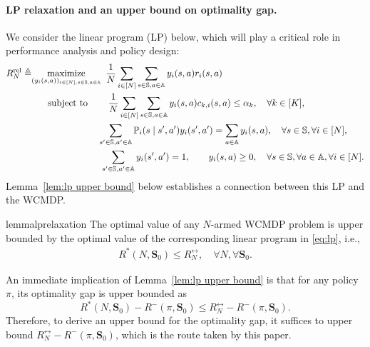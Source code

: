 \documentclass[11pt,letterpaper]{article}
\begin{document}
\paragraph{LP relaxation and an upper bound on optimality gap.}
We consider the linear program (LP) below, which will play a critical role in performance analysis and policy design:
\begin{subequations}\label{eq:lp}
\begin{align}
    R^{\rel}_N\triangleq&\underset{(y_i(s,a))_{i\in [N], s\in\sspa,a\in\aspa}}{\text{maximize}}\mspace{9mu}\frac{1}{N}\sum_{i\in[N]} \sum_{s\in\sspa,a\in\aspa} y_i(s,a)r_i(s,a)\\
    \label{eq:lp:budget-constraint}
    &\mspace{32mu}\text{subject to}\mspace{40mu}\frac{1}{N}\sum_{i\in[N]}\sum_{s\in\sspa,a\in\aspa} y_i(s,a)c_{k,i}(s,a)\leq \alpha_k,\quad\forall k\in[K],\\
    \label{eq:lp:stationarity-constraint}
    &\mspace{130mu} \sum_{s'\in\sspa,a'\in\aspa} \PP_i(s\mid s',a')y_i(s',a')=\sum_{a\in\aspa}y_i(s,a),\quad\forall s\in\sspa,\forall i\in[N],\\
    \label{eq:lp:probability-constraint}
   &\mspace{135mu}\sum_{s'\in\sspa,a'\in\aspa}y_i(s',a')=1, \qquad y_i(s,a)\geq 0, \quad \forall s\in\sspa,  \forall a\in \aspa,\forall i\in[N].
\end{align}
\end{subequations}
Lemma~\ref{lem:lp upper bound} below establishes a connection between this LP and the WCMDP.
\begin{restatable}{lemma}{lprelaxation}\label{lem:lp upper bound}
The optimal value of any $N$-armed WCMDP problem is upper bounded by the optimal value of the corresponding linear program in \eqref{eq:lp}, i.e.,
    \begin{align*}
        R^*(N,\bm{S}_0)\le R_N^{\rel},\quad\forall N,\forall \bm{S}_0.
    \end{align*}
\end{restatable}

An immediate implication of Lemma~\ref{lem:lp upper bound} is that for any policy $\pi$, its optimality gap is upper bounded as
\begin{equation}
    R^*(N,\bm{S}_0)-R^-(\pi,\bm{S}_0) \le R_N^{\rel}-R^-(\pi,\bm{S}_0).
\end{equation}
Therefore, to derive an upper bound for the optimality gap, it suffices to upper bound $R_N^{\rel}-R^-(\pi,\bm{S}_0)$, which is the route taken by this paper.
\end{document}
